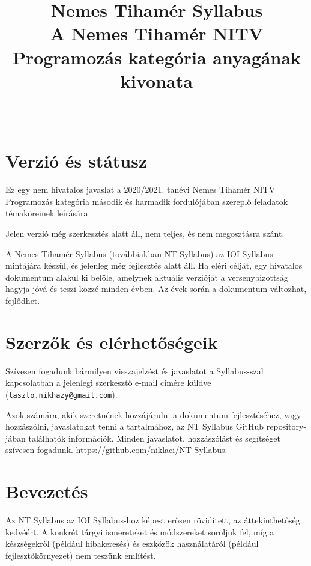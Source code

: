 \documentclass[a4paper,11pt,oneside]{article}
\begin{document}
\title{\sf Nemes Tihamér Syllabus \\
    \large A Nemes Tihamér NITV Programozás kategória anyagának kivonata}
\author{}
\date{~}
\maketitle

\section{Verzió és státusz}%

Ez egy nem hivatalos javaslat a 2020/2021. tanévi Nemes Tihamér NITV Programozás kategória
második és harmadik fordulójában szereplő feladatok témaköreinek leírására.

\medskip

Jelen verzió még szerkesztés alatt áll, nem teljes, és nem megosztásra szánt.

\medskip

A Nemes Tihamér Syllabus (továbbiakban NT Syllabus) az IOI Syllabus mintájára készül,
és jelenleg még fejlesztés alatt áll. Ha eléri célját, egy hivatalos dokumentum alakul ki belőle,
amelynek aktuális verzióját a versenybizottság hagyja jóvá és teszi közzé minden évben.
Az évek során a dokumentum változhat, fejlődhet.


\section{Szerzők és elérhetőségeik}%

Szívesen fogadunk bármilyen visszajelzést és javaslatot a Syllabus-szal kapcsolatban
a jelenlegi szerkesztő e-mail címére küldve (\verb!laszlo.nikhazy@gmail.com!).

Azok számára, akik szeretnének hozzájárulni a dokumentum fejlesztéséhez, vagy hozzászólni,
javaslatokat tenni a tartalmához, az NT Syllabus GitHub repository-jában találhatók információk.
Minden javaslatot, hozzászólást és segítséget szívesen fogadunk.
\url{https://github.com/niklaci/NT-Syllabus}.

\section{Bevezetés}\label{sec:intro}%

Az NT Syllabus az IOI Syllabus-hoz képest erősen rövidített, az áttekinthetőség kedvéért.
A konkrét tárgyi ismereteket és módszereket soroljuk fel, míg a készségekről (például hibakeresés)
és eszközök használatáról (például fejlesztőkörnyezet) nem teszünk említést.
\end{document}
